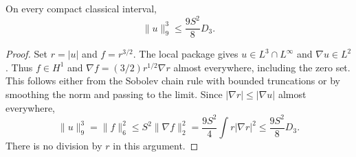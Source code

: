 \begin{lemma}
\label{dc:l9}
On every compact classical interval,
\begin{equation}\label{dc:l9-bound}
 \|u\|_9^3\le \frac{9S^2}{8}D_3.
\end{equation}
\end{lemma}
\begin{proof}
Set $r=|u|$ and $f=r^{3/2}$.  The local package gives $u\in L^3\cap
L^\infty$ and $\nabla u\in L^2$.  Thus $f\in H^1$ and
$\nabla f=(3/2)r^{1/2}\nabla r$ almost everywhere, including the zero set.
This follows either from the Sobolev chain rule with bounded truncations or
by smoothing the norm and passing to the limit.  Since
$|\nabla r|\le |\nabla u|$ almost everywhere,
\[
 \|u\|_9^3=\|f\|_6^2
 \le S^2\|\nabla f\|_2^2
 =\frac{9S^2}{4}\int r|\nabla r|^2
 \le\frac{9S^2}{8}D_3.
\]
There is no division by $r$ in this argument.
\end{proof}

